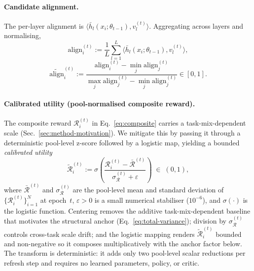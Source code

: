 \paragraph{Candidate alignment.}
The per-layer alignment is
$\langle \bar h_l(x_i;\theta_{t-1}), v_l^{(t)} \rangle$. Aggregating
across layers and normalising,
\begin{equation}
  \mathrm{align}_i^{(t)} :=
  \frac{1}{L}\sum_{l=1}^{L}
  \bigl\langle \bar h_l(x_i;\theta_{t-1}), v_l^{(t)} \bigr\rangle,
  \label{eq:align-raw}
\end{equation}
\begin{equation}
  \widetilde{\mathrm{align}}_i^{(t)} :=
  \frac{\mathrm{align}_i^{(t)} - \min_j \mathrm{align}_j^{(t)}}
       {\max_j \mathrm{align}_j^{(t)} - \min_j \mathrm{align}_j^{(t)}}
  \in [0,1].
  \label{eq:align}
\end{equation}

\paragraph{Calibrated utility (pool-normalised composite reward).}
The composite reward $\mathcal{R}_i^{(t)}$ in
Eq.~\ref{eq:composite} carries a task-mix-dependent scale
(Sec.~\ref{sec:method-motivation}). We mitigate this by passing it
through a deterministic pool-level z-score followed by a logistic
map, yielding a bounded \emph{calibrated utility}
\begin{equation}
  \tilde{\mathcal{R}}_i^{(t)}
  :=
  \sigma\!\left(
    \frac{\mathcal{R}_i^{(t)} - \bar{\mathcal{R}}^{(t)}}
         {\sigma_{\mathcal{R}}^{(t)} + \varepsilon}
  \right)
  \;\in\; (0,1),
  \label{eq:calibrated}
\end{equation}
where $\bar{\mathcal{R}}^{(t)}$ and $\sigma_{\mathcal{R}}^{(t)}$
are the pool-level mean and standard deviation of
$\{\mathcal{R}_i^{(t)}\}_{i=1}^N$ at epoch~$t$, $\varepsilon>0$ is
a small numerical stabiliser ($10^{-6}$), and $\sigma(\cdot)$ is
the logistic function. Centering removes the additive
task-mix-dependent baseline that motivates the structural anchor
(Eq.~\ref{eq:total-variance}); division by
$\sigma_{\mathcal{R}}^{(t)}$ controls cross-task scale drift; and
the logistic mapping renders $\tilde{\mathcal{R}}_i^{(t)}$ bounded
and non-negative so it composes multiplicatively with the anchor
factor below. The transform is deterministic: it adds only two
pool-level scalar reductions per refresh step and requires no
learned parameters, policy, or critic.

